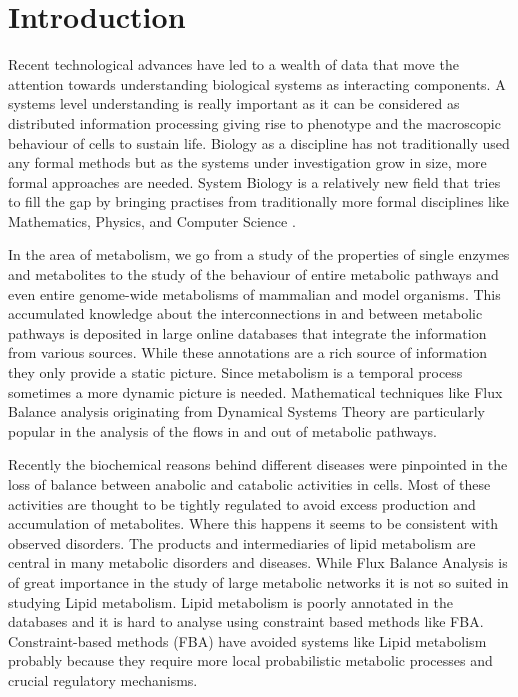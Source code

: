 

\chapter{Introduction}  %

\ifpdf
    \graphicspath{{Chapter1/Figs/Raster/}{Chapter1/Figs/PDF/}{Chapter1/Figs/}}
\else
    \graphicspath{{Chapter1/Figs/Vector/}{Chapter1/Figs/}}
\fi

Recent technological advances have led to a wealth of data that move
the attention towards understanding biological systems as interacting components.
A systems level understanding is really important
as it can be considered as distributed information processing giving rise to phenotype and the macroscopic
behaviour of cells to sustain life. Biology as a discipline has not traditionally used
any formal methods but as the systems under investigation grow in size,
more formal approaches are needed. System Biology is a relatively
new field that tries to fill the gap by bringing practises from
traditionally more formal disciplines like Mathematics, Physics, and
Computer Science \cite [] {ideker2001new}.

In the area of metabolism, we go from a study of the properties
of single enzymes and metabolites to the study of the behaviour of
entire metabolic pathways and even entire genome-wide metabolisms
of mammalian and model organisms. This accumulated knowledge about the
interconnections in and between metabolic pathways is deposited in
large online databases that integrate the information from various
sources. While these annotations are a rich source of information they
only provide a static picture.
Since metabolism is a temporal process sometimes a more dynamic
picture is needed. Mathematical techniques like Flux Balance analysis
originating from Dynamical Systems Theory are particularly popular in
the analysis of the flows in and out of metabolic pathways.

Recently the biochemical reasons behind
different diseases were pinpointed  in the loss of balance between anabolic and catabolic
activities in cells. Most of these activities are thought to be tightly
regulated to avoid excess production and accumulation of
metabolites. Where this happens it seems to be consistent with observed disorders. The products and
intermediaries of lipid metabolism are central in many metabolic
disorders and diseases. While Flux Balance
Analysis is of great importance in the study of large metabolic
networks it is not so suited in studying Lipid metabolism. Lipid
metabolism is poorly annotated in the databases and it is hard to
analyse using constraint based methods like FBA. Constraint-based methods (FBA) have avoided systems like Lipid metabolism
probably because they require more local probabilistic metabolic
processes and crucial regulatory mechanisms.

